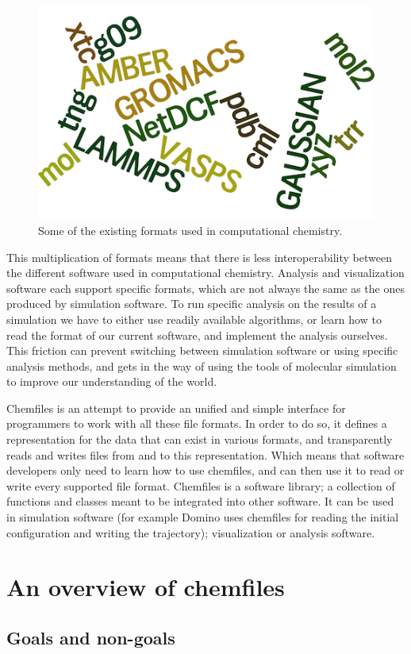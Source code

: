 \documentclass[thesis]{subfiles}
\begin{document}
\begin{figure}[ht]
    \centering
    \includegraphics[width=.4\textwidth]{figures/images/files-formats}
    \caption{Some of the existing formats used in computational chemistry.}
    \label{fig:chemfiles:formats}
\end{figure}

This multiplication of formats means that there is less interoperability between
the different software used in computational chemistry. Analysis and
visualization software each support specific formats, which are not always the
same as the ones produced by simulation software. To run specific analysis on
the results of a simulation we have to either use readily available algorithms,
or learn how to read the format of our current software, and implement the
analysis ourselves. This friction can prevent switching between simulation
software or using specific analysis methods, and gets in the way of using the
tools of molecular simulation to improve our understanding of the world.

Chemfiles is an attempt to provide an unified and simple interface for
programmers to work with all these file formats. In order to do so, it defines a
representation for the data that can exist in various formats, and transparently
reads and writes files from and to this representation. Which means that
software developers only need to learn how to use chemfiles, and can then use it
to read or write every supported file format. Chemfiles is a software library; a
collection of functions and classes meant to be integrated into other software.
It can be used in simulation software (for example Domino uses chemfiles for
reading the initial configuration and writing the trajectory); visualization or
analysis software.

\newpage
\section{An overview of chemfiles}

\subsection{Goals and non-goals}
\end{document}
